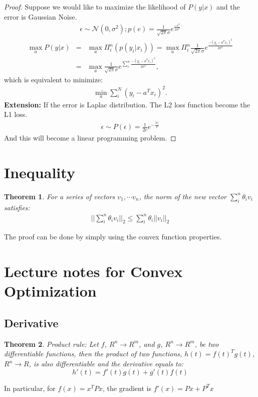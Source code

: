 \documentclass[12pt]{article}
\newtheorem{theorem}{Theorem}[section]
\begin{document}
\begin{proof}
	Suppose we would like to maximize the likelihood of $P(y|x)$ and the error is Gaussian Noise.
	\begin{eqnarray}
		\epsilon \sim \mathcal{N}(0, \sigma^2); p(e) = \frac{1}{\sqrt{2\pi}\sigma}e^{\frac{-\epsilon^2}{2\sigma^2}}
	\end{eqnarray}
	\begin{eqnarray}
		\max_{a} P(y|x)&=& \max_{a} \Pi_i^n (p(y_i|x_i)) = \max_a \Pi_i^n\frac{1}{\sqrt{2\pi}\sigma}e^{\frac{-(y_i - a^T x_i)^2}{2\sigma^2}}\\
		&=& \max_a \frac{1}{\sqrt{2\pi}\sigma}e^{\sum_i^n \frac{-(y_i - a^Tx_i)^2}{2\sigma^2}},
	\end{eqnarray}
	which is equivalent to minimize:
	\begin{eqnarray}
		\min_a \sum_i^N (y_i - a^Tx_i)^2.
	\end{eqnarray}
{\bf Extension: } If the error is Laplac distribution. The L2 loss function become the L1 loss.
\begin{eqnarray}
	\epsilon \sim P(\epsilon) = \frac{1}{2c} e^{-\frac{|\epsilon|}{c}}
\end{eqnarray}
And this will become a linear programming problem.
\end{proof}

\section{Inequality}
\begin{theorem}
	For a series of vectors $v_1, \cdots v_n$, the norm of the new vector $\sum_i^n \theta_i v_i$ satisfies:
	\begin{eqnarray}
		||\sum_i^n \theta_i v_i||_2 \le \sum_i^n \theta_i||v_i||_2
	\end{eqnarray}
\end{theorem}
The proof can be done by simply using the convex function properties.

\section{Lecture notes for Convex Optimization}
\subsection{Derivative}
\begin{theorem}
	Product rule: Let $f$, $R^n\to R^m$, and $g$, $R^n\to R^m$, be two differentiable functions, then the product of two functions, $h(t) = f(t)^Tg(t)$, $R^n\to R$, is also differentiable and the derivative equals to:
	\[
	h'(t) = f'(t)g(t) + g'(t)f(t)
	\]
\end{theorem}
In particular, for $f(x) = x^TPx$, the gradient is $f'(x) = Px + P^Tx$
\end{document}
